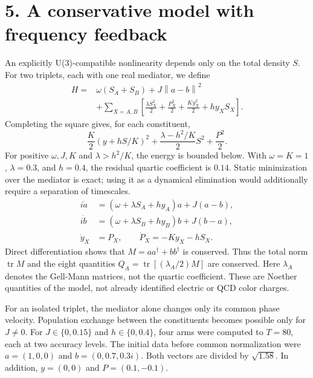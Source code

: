 \documentclass[a4paper,11pt]{article}
\newcommand{\norm}[1]{\left\lVert#1\right\rVert}
\begin{document}
\section*{5. A conservative model with frequency feedback}
An explicitly U(3)-compatible nonlinearity depends only on the total density $S$. For two triplets, each with one real mediator, we define
\begin{equation}
\begin{aligned}
H={}&\omega(S_A+S_B)+J\norm{a-b}^2\\
&+\sum_{X=A,B}\left[\frac{\lambda S_X^2}{2}+\frac{P_X^2}{2}
+\frac{Ky_X^2}{2}+hy_XS_X\right].
\end{aligned}\tag{7}
\end{equation}
Completing the square gives, for each constituent,
\begin{equation}
\frac{K}{2}(y+hS/K)^2+\frac{\lambda-h^2/K}{2}S^2+\frac{P^2}{2}.\tag{8}
\end{equation}
For positive $\omega,J,K$ and $\lambda>h^2/K$, the energy is bounded below. With $\omega=K=1$, $\lambda=0.3$, and $h=0.4$, the residual quartic coefficient is $0.14$. Static minimization over the mediator is exact; using it as a dynamical elimination would additionally require a separation of timescales.
\begin{equation}
\begin{aligned}
i\dot a&=(\omega+\lambda S_A+hy_A)a+J(a-b),\\
i\dot b&=(\omega+\lambda S_B+hy_B)b+J(b-a),\\
\dot y_X&=P_X,\qquad \dot P_X=-Ky_X-hS_X.
\end{aligned}\tag{9}
\end{equation}
Direct differentiation shows that $M=aa^\dagger+bb^\dagger$ is conserved. Thus the total norm $\operatorname{tr}M$ and the eight quantities $Q_A=\operatorname{tr}[(\lambda_A/2)M]$ are conserved. Here $\lambda_A$ denotes the Gell-Mann matrices, not the quartic coefficient. These are Noether quantities of the model, not already identified electric or QCD color charges.

For an isolated triplet, the mediator alone changes only its common phase velocity. Population exchange between the constituents becomes possible only for $J\ne0$. For $J\in\{0,0.15\}$ and $h\in\{0,0.4\}$, four arms were computed to $T=80$, each at two accuracy levels. The initial data before common normalization were $a=(1,0,0)$ and $b=(0,0.7,0.3i)$. Both vectors are divided by $\sqrt{1.58}$. In addition, $y=(0,0)$ and $P=(0.1,-0.1)$.
\end{document}
